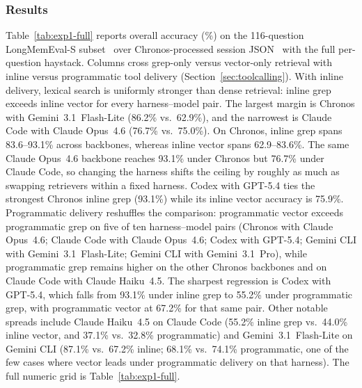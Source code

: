 \documentclass[sigconf,nonacm]{acmart}
\begin{document}
\subsubsection{Results}
  \label{sec:exp1-results}
  Table~\ref{tab:exp1-full} reports overall accuracy (\%) on the 116-question LongMemEval-S
  subset~\cite{longmemeval} over Chronos-processed session JSON~\cite{chronos} with the full
  per-question haystack.
  Columns cross grep-only versus vector-only retrieval with inline versus programmatic tool
  delivery (Section~\ref{sec:toolcalling}).
  With inline delivery, lexical search is uniformly stronger than dense retrieval: inline grep
  exceeds inline vector for every harness--model pair.
  The largest margin is Chronos with Gemini~3.1~Flash-Lite (86.2\% vs.\ 62.9\%), and the
  narrowest is Claude Code with Claude Opus~4.6 (76.7\% vs.\ 75.0\%).
  On Chronos, inline grep spans 83.6--93.1\% across backbones, whereas inline vector spans
  62.9--83.6\%.
  The same Claude Opus~4.6 backbone reaches 93.1\% under Chronos but 76.7\% under Claude Code, so
   changing the harness shifts the ceiling by roughly as much as swapping retrievers within a
  fixed harness.
  Codex with GPT-5.4 ties the strongest Chronos inline grep (93.1\%) while its inline vector
  accuracy is 75.9\%.
  Programmatic delivery reshuffles the comparison: programmatic vector exceeds programmatic grep
  on five of ten harness--model pairs (Chronos with Claude Opus~4.6; Claude Code with Claude
  Opus~4.6; Codex with GPT-5.4; Gemini CLI with Gemini~3.1~Flash-Lite; Gemini CLI with
  Gemini~3.1~Pro), while programmatic grep remains higher on the other Chronos backbones and on
  Claude Code with Claude Haiku~4.5.
  The sharpest regression is Codex with GPT-5.4, which falls from 93.1\% under inline grep to
  55.2\% under programmatic grep, with programmatic vector at 67.2\% for that same pair.
  Other notable spreads include Claude Haiku~4.5 on Claude Code (55.2\% inline grep vs.\ 44.0\% inline vector, and 37.1\% vs.\ 32.8\% programmatic) and Gemini~3.1~Flash-Lite on Gemini CLI (87.1\% vs.\ 67.2\% inline; 68.1\% vs.\ 74.1\% programmatic, one of the few cases where vector leads under programmatic delivery on that harness).
  The full numeric grid is Table~\ref{tab:exp1-full}.
\end{document}
